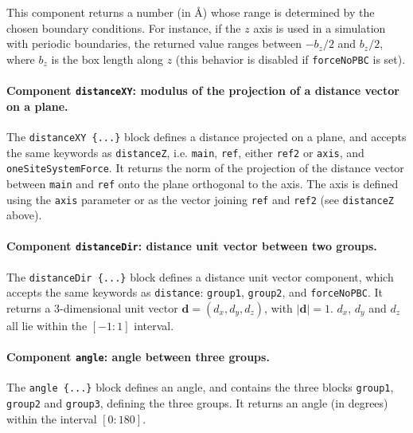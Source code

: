 This component returns a number (in \AA{}) whose range is determined
by the chosen boundary conditions.  For instance, if the $z$ axis is
used in a simulation with periodic boundaries, the returned value ranges
between $-b_{z}/2$ and $b_{z}/2$, where $b_{z}$ is the box length
along $z$ (this behavior is disabled if \texttt{forceNoPBC} is set).


\paragraph*{Component \texttt{distanceXY}: modulus of the projection
 of a distance vector on a plane.}
The \texttt{distanceXY~\{...\}} block defines a distance projected on
a plane, and accepts the same keywords as \texttt{distanceZ}, i.e.
\texttt{main}, \texttt{ref}, either \texttt{ref2} or \texttt{axis},
and \texttt{oneSiteSystemForce}.  It returns the norm of the
projection of the distance vector between \texttt{main} and
\texttt{ref} onto the plane orthogonal to the axis.  The axis is
defined using the \texttt{axis} parameter or as the vector joining
\texttt{ref} and \texttt{ref2} (see \texttt{distanceZ} above).


\paragraph*{Component \texttt{distanceDir}: distance unit vector
  between two groups.}  The \texttt{distanceDir~\{...\}} block defines
a distance unit vector component, which accepts the same keywords as
\texttt{distance}: \texttt{group1}, \texttt{group2}, and
\texttt{forceNoPBC}.  It returns a
3-dimensional unit vector $\mathbf{d} = (d_{x}, d_{y}, d_{z})$, with
$|\mathbf{d}| = 1$.  $d_{x}$, $d_{y}$ and $d_{z}$ all lie within the
$[-1:1]$ interval.


\paragraph*{Component \texttt{angle}: angle between three groups.}
The \texttt{angle~\{...\}} block defines an angle, and contains the
three blocks \texttt{group1}, \texttt{group2} and \texttt{group3}, defining
the three groups.  It returns an angle (in degrees) within the
interval $[0:180]$.


